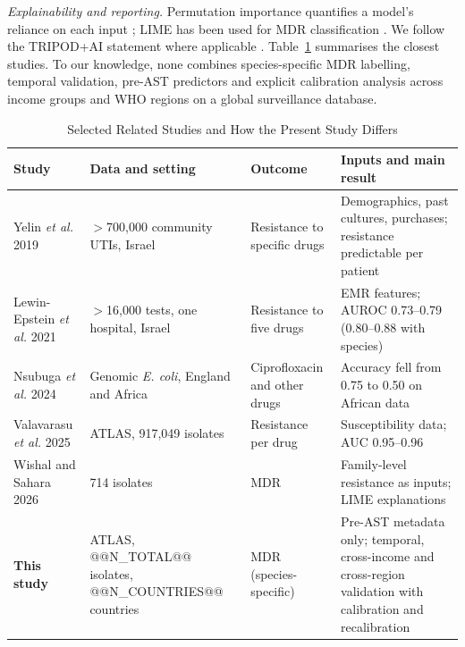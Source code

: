 \documentclass[conference]{IEEEtran}
\newcommand{\sci}[1]{\textit{#1}}
\begin{document}
\textit{Explainability and reporting.} Permutation importance quantifies a model's reliance on each input \cite{breiman2001,fisher2019}; LIME has been used for MDR classification \cite{wishal2026}. We follow the TRIPOD+AI statement where applicable \cite{collins2024}. Table~\ref{tab:lit} summarises the closest studies. To our knowledge, none combines species-specific MDR labelling, temporal validation, pre-AST predictors and explicit calibration analysis across income groups and WHO regions on a global surveillance database.

\begin{table}[!t]
\caption{Selected Related Studies and How the Present Study Differs}\label{tab:lit}
\centering\footnotesize
\begin{tabularx}{\textwidth}{>{\raggedright\arraybackslash}p{3.0cm}>{\raggedright\arraybackslash}X>{\raggedright\arraybackslash}p{3.4cm}>{\raggedright\arraybackslash}X}
\toprule
Study & Data and setting & Outcome & Inputs and main result \\
\midrule
Yelin \textit{et al.} 2019 \cite{yelin2019} & $>$700{,}000 community UTIs, Israel & Resistance to specific drugs & Demographics, past cultures, purchases; resistance predictable per patient \\
Lewin-Epstein \textit{et al.} 2021 \cite{lewinepstein2021} & $>$16{,}000 tests, one hospital, Israel & Resistance to five drugs & EMR features; AUROC 0.73--0.79 (0.80--0.88 with species) \\
Nsubuga \textit{et al.} 2024 \cite{nsubuga2024} & Genomic \sci{E. coli}, England and Africa & Ciprofloxacin and other drugs & Accuracy fell from 0.75 to 0.50 on African data \\
Valavarasu \textit{et al.} 2025 \cite{valavarasu2025} & ATLAS, 917{,}049 isolates & Resistance per drug & Susceptibility data; AUC 0.95--0.96 \\
Wishal and Sahara 2026 \cite{wishal2026} & 9{,}714 isolates & MDR & Family-level resistance as inputs; LIME explanations \\
\midrule
\textbf{This study} & ATLAS, @@N_TOTAL@@ isolates, @@N_COUNTRIES@@ countries & MDR (species-specific) & Pre-AST metadata only; temporal, cross-income and cross-region validation with calibration and recalibration \\
\bottomrule
\end{tabularx}
\end{table}

\end{document}
